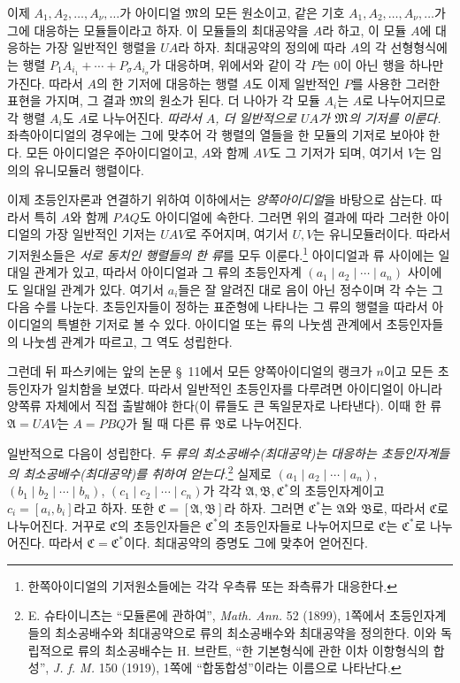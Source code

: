 이제 $A_1,A_2,\ldots,A_\nu,\ldots$가 아이디얼 $\mathfrak{M}$의 모든 원소이고, 같은 기호 $A_1,A_2,\ldots,A_\nu,\ldots$가 그에 대응하는 모듈들이라고 하자. 이 모듈들의 최대공약을 $A$라 하고, 이 모듈 $A$에 대응하는 가장 일반적인 행렬을 $UA$라 하자. 최대공약의 정의에 따라 $A$의 각 선형형식에는 행렬 $P_1A_{i_1}+\cdots+P_\sigma A_{i_\sigma}$가 대응하며, 위에서와 같이 각 $P$는 0이 아닌 행을 하나만 가진다. 따라서 $A$의 한 기저에 대응하는 행렬 $A$도 이제 일반적인 $P$를 사용한 그러한 표현을 가지며, 그 결과 $\mathfrak{M}$의 원소가 된다. 더 나아가 각 모듈 $A_i$는 $A$로 나누어지므로 각 행렬 $A_i$도 $A$로 나누어진다. \emph{따라서 $A$, 더 일반적으로 $UA$가 $\mathfrak{M}$의 기저를 이룬다.} 좌측아이디얼의 경우에는 그에 맞추어 각 행렬의 열들을 한 모듈의 기저로 보아야 한다. 모든 아이디얼은 주아이디얼이고, $A$와 함께 $AV$도 그 기저가 되며, 여기서 $V$는 임의의 유니모듈러 행렬이다.

이제 초등인자론과 연결하기 위하여 이하에서는 \emph{양쪽아이디얼}을 바탕으로 삼는다. 따라서 특히 $A$와 함께 $PAQ$도 아이디얼에 속한다. 그러면 위의 결과에 따라 그러한 아이디얼의 가장 일반적인 기저는 $UAV$로 주어지며, 여기서 $U,V$는 유니모듈러이다. 따라서 기저원소들은 \emph{서로 동치인 행렬들의 한 류}를 모두 이룬다.\footnote{한쪽아이디얼의 기저원소들에는 각각 우측류 또는 좌측류가 대응한다.} 아이디얼과 류 사이에는 일대일 관계가 있고, 따라서 아이디얼과 그 류의 초등인자계 $(a_1\mid a_2\mid\cdots\mid a_n)$ 사이에도 일대일 관계가 있다. 여기서 $a_i$들은 잘 알려진 대로 음이 아닌 정수이며 각 수는 그 다음 수를 나눈다. 초등인자들이 정하는 표준형에 나타나는 그 류의 행렬을 따라서 아이디얼의 특별한 기저로 볼 수 있다. 아이디얼 또는 류의 나눗셈 관계에서 초등인자들의 나눗셈 관계가 따르고, 그 역도 성립한다.

그런데 뒤 파스키에는 앞의 논문 \S~11에서 모든 양쪽아이디얼의 랭크가 $n$이고 모든 초등인자가 일치함을 보였다. 따라서 일반적인 초등인자를 다루려면 아이디얼이 아니라 양쪽류 자체에서 직접 출발해야 한다(이 류들도 큰 독일문자로 나타낸다). 이때 한 류 $\mathfrak A=UAV$는 $A=PBQ$가 될 때 다른 류 $\mathfrak B$로 나누어진다.

일반적으로 다음이 성립한다. \emph{두 류의 최소공배수(최대공약)는 대응하는 초등인자계들의 최소공배수(최대공약)를 취하여 얻는다.}\footnote{E. 슈타이니츠는 ``모듈론에 관하여'', \emph{Math. Ann.} 52 (1899), 1쪽에서 초등인자계들의 최소공배수와 최대공약으로 류의 최소공배수와 최대공약을 정의한다. 이와 독립적으로 류의 최소공배수는 H. 브란트, ``한 기본형식에 관한 이차 이항형식의 합성'', \emph{J. f. M.} 150 (1919), 1쪽에 ``합동합성''이라는 이름으로 나타난다.} 실제로 $(a_1\mid a_2\mid\cdots\mid a_n)$, $(b_1\mid b_2\mid\cdots\mid b_n)$, $(c_1\mid c_2\mid\cdots\mid c_n)$가 각각 $\mathfrak A,\mathfrak B,\mathfrak C^*$의 초등인자계이고 $c_i=[a_i,b_i]$라고 하자. 또한 $\mathfrak C=[\mathfrak A,\mathfrak B]$라 하자. 그러면 $\mathfrak C^*$는 $\mathfrak A$와 $\mathfrak B$로, 따라서 $\mathfrak C$로 나누어진다. 거꾸로 $\mathfrak C$의 초등인자들은 $\mathfrak C^*$의 초등인자들로 나누어지므로 $\mathfrak C$는 $\mathfrak C^*$로 나누어진다. 따라서 $\mathfrak C=\mathfrak C^*$이다. 최대공약의 증명도 그에 맞추어 얻어진다.

